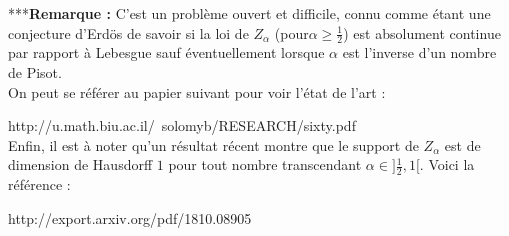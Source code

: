 ***\textbf{Remarque :} C'est un problème ouvert et difficile, connu comme étant une conjecture d'Erdös de savoir si la loi de $Z_{\alpha}$ (pour$\alpha\geq \frac{1}{2}$) est absolument continue par rapport à Lebesgue sauf éventuellement lorsque $\alpha$ est l'inverse d'un nombre de Pisot.\\

On peut se référer au papier suivant pour voir l'état de l'art :

http://u.math.biu.ac.il/~solomyb/RESEARCH/sixty.pdf\\

Enfin, il est à noter qu'un résultat récent montre que le support de $Z_{\alpha}$ est de dimension de Hausdorff $1$ pour tout nombre transcendant $\alpha\in]\frac{1}{2},1[.$ Voici la référence :

http://export.arxiv.org/pdf/1810.08905
